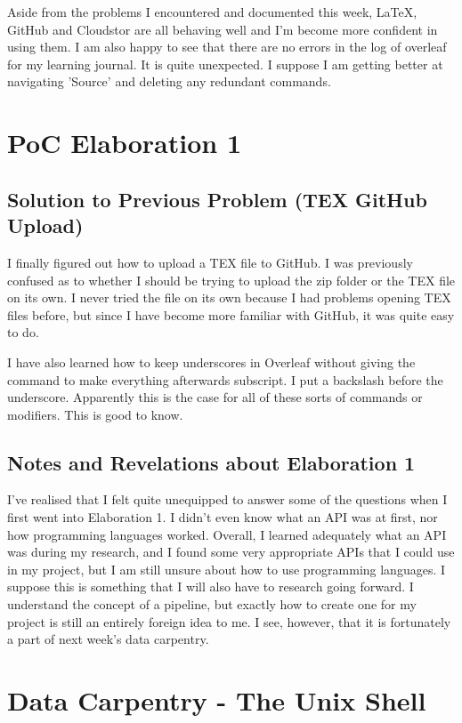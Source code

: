 \documentclass{article}
\begin{document}
Aside from the problems I encountered and documented this week, LaTeX, GitHub and Cloudstor are all behaving well and I’m become more confident in using them. I am also happy to see that there are no errors in the log of overleaf for my learning journal. It is quite unexpected. I suppose I am getting better at navigating 'Source' and deleting any redundant commands.
\newpage
\date{23rd-29th August 2019}
\section{PoC Elaboration 1}
\subsection{Solution to Previous Problem (TEX GitHub Upload)}
I finally figured out how to upload a TEX file to GitHub. I was previously confused as to whether I should be trying to upload the zip folder or the TEX file on its own. I never tried the file on its own because I had problems opening TEX files before, but since I have become more familiar with GitHub, it was quite easy to do.

I have also learned how to keep underscores in Overleaf without giving the command to make everything afterwards subscript. I put a backslash before the underscore. Apparently this is the case for all of these sorts of commands or modifiers. This is good to know.

\subsection{Notes and Revelations about Elaboration 1}
I've realised that I felt quite unequipped to answer some of the questions when I first went into Elaboration 1. I didn't even know what an API was at first, nor how programming languages worked. Overall, I learned adequately what an API was during my research, and I found some very appropriate APIs that I could use in my project, but I am still unsure about how to use programming languages. I suppose this is something that I will also have to research going forward. I understand the concept of a pipeline, but exactly how to create one for my project is still an entirely foreign idea to me. I see, however, that it is fortunately a part of next week's data carpentry.

\section{Data Carpentry - The Unix Shell}
\end{document}
